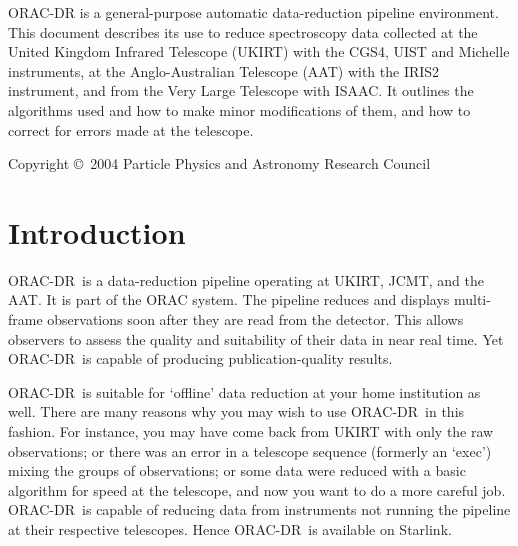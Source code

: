 \documentclass[twoside,11pt]{article}
\newcommand{\stardocinitials}  {SUN}
\newcommand{\stardoccopyright} {Copyright \copyright\ 2004 Particle Physics and Astronomy Research Council}
\newcommand{\stardocnumber}    {236.4}
\newcommand{\stardocabstract}  {{\footnotesize ORAC-DR} is a
general-purpose automatic data-reduction pipeline environment.  This
document describes its use to reduce spectroscopy data collected at the
United Kingdom Infrared Telescope (UKIRT) with the CGS4, UIST and Michelle
instruments, at the Anglo-Australian Telescope (AAT) with the IRIS2
instrument, and from the Very Large Telescope with ISAAC. It outlines the
algorithms used and how to make minor modifications of them, and how
to correct for errors made at the telescope.}
\newcommand{\stardocname}{\stardocinitials /\stardocnumber}
\newcommand{\htmladdnormallink}[2]{#1}
\newenvironment{latexonly}{}{}
\newcommand{\xlabel}[1]{}
\renewcommand{\_}{\texttt{\symbol{95}}}
\newcommand{\ORACDR}{{\footnotesize ORAC-DR}}
\newcommand{\AAT}{\htmladdnormallink{AAT}{http://www.aao.gov.au/}}
\newcommand{\JCMT}{\htmladdnormallink{JCMT}{http://www.jach.hawaii.edu/JACpublic/JCMT/}}
\newcommand{\UKIRT}{\htmladdnormallink{UKIRT}{http://www.jach.hawaii.edu/JACpublic/UKIRT/}}
\renewcommand{\thepage}{\roman{page}}
\begin{document}
\stardocabstract

\begin{latexonly}
\newpage
\vspace*{\fill}
\stardoccopyright
\end{latexonly}

  \newpage
  \begin{latexonly}
    \setlength{\parskip}{0mm}
    \tableofcontents
    \setlength{\parskip}{\medskipamount}
    \markboth{\stardocname}{\stardocname}
  \end{latexonly}

\cleardoublepage
\renewcommand{\thepage}{\arabic{page}}
\setcounter{page}{1}


\section{\xlabel{introduction}Introduction\label{introduction}}

\ORACDR\ is a data-reduction pipeline operating at \UKIRT, \JCMT, and
the \AAT. It is part of the \htmladdnormallink{ORAC system}{http://www.stsci.edu/stsci/meetings/adassVII/bridgera.html}.
The pipeline reduces and displays multi-frame observations soon after
they are read from the detector. This allows observers to assess the
quality and suitability of their data in near real time. Yet \ORACDR\
is capable of producing publication-quality results.

\ORACDR\ is suitable for `offline' data reduction at your home
institution as well. There are many reasons why you may wish to use
\ORACDR\ in this fashion. For instance, you may have come back from
UKIRT with only the raw observations; or there was an error in a
telescope sequence (formerly an `exec') mixing the groups of
observations; or some data were reduced with a basic algorithm for
speed at the telescope, and now you want to do a more careful job.
\ORACDR\ is capable of reducing data from instruments not running
the pipeline at their respective telescopes. Hence \ORACDR\ is 
available on Starlink.
\end{document}
